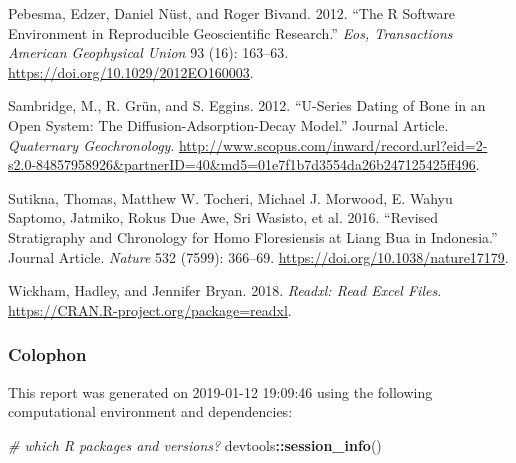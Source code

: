 \documentclass[]{elsarticle} %
\newenvironment{Shaded}{\begin{snugshade}}{\end{snugshade}}
\newcommand{\CommentTok}[1]{\textcolor[rgb]{0.56,0.35,0.01}{\textit{#1}}}
\newcommand{\KeywordTok}[1]{\textcolor[rgb]{0.13,0.29,0.53}{\textbf{#1}}}
\newcommand{\NormalTok}[1]{#1}
\newcommand{\OperatorTok}[1]{\textcolor[rgb]{0.81,0.36,0.00}{\textbf{#1}}}
\begin{document}
\leavevmode\hypertarget{ref-Pebesma_Nust_Bivand_2012}{}%
Pebesma, Edzer, Daniel Nüst, and Roger Bivand. 2012. ``The R Software Environment in Reproducible Geoscientific Research.'' \emph{Eos, Transactions American Geophysical Union} 93 (16): 163--63. \url{https://doi.org/10.1029/2012EO160003}.

\leavevmode\hypertarget{ref-Sambridge2012}{}%
Sambridge, M., R. Grün, and S. Eggins. 2012. ``U-Series Dating of Bone in an Open System: The Diffusion-Adsorption-Decay Model.'' Journal Article. \emph{Quaternary Geochronology}. \url{http://www.scopus.com/inward/record.url?eid=2-s2.0-84857958926\&partnerID=40\&md5=01e7f1b7d3554da26b247125425ff496}.

\leavevmode\hypertarget{ref-Sutikna2016}{}%
Sutikna, Thomas, Matthew W. Tocheri, Michael J. Morwood, E. Wahyu Saptomo, Jatmiko, Rokus Due Awe, Sri Wasisto, et al. 2016. ``Revised Stratigraphy and Chronology for Homo Floresiensis at Liang Bua in Indonesia.'' Journal Article. \emph{Nature} 532 (7599): 366--69. \url{https://doi.org/10.1038/nature17179}.

\leavevmode\hypertarget{ref-Wickham_readxl}{}%
Wickham, Hadley, and Jennifer Bryan. 2018. \emph{Readxl: Read Excel Files}. \url{https://CRAN.R-project.org/package=readxl}.

\newpage

\hypertarget{colophon}{%
\subsubsection{Colophon}\label{colophon}}

This report was generated on 2019-01-12 19:09:46 using the following computational environment and dependencies:

\begin{Shaded}
\begin{Highlighting}[]
\CommentTok{# which R packages and versions?}
\NormalTok{devtools}\OperatorTok{::}\KeywordTok{session_info}\NormalTok{()}
\end{Highlighting}
\end{Shaded}
\end{document}
